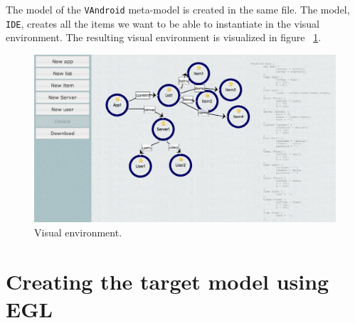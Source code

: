 The model of the \texttt{VAndroid} meta-model is created in the same file. The model, \texttt{IDE}, creates all the items we want to be able to instantiate in the visual environment. The resulting visual environment is visualized in figure ~\ref{fig:visual_environment}.
\begin{figure}[h!]
\centering
\includegraphics[width=1.0\textwidth]{images/app1_visual_environment.jpg}
\caption{Visual environment.}
\label{fig:visual_environment}
\end{figure}

\section{Creating the target model using EGL}

